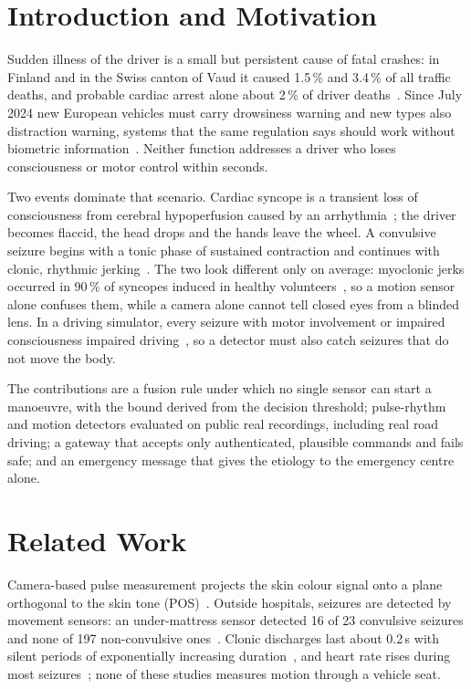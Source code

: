 \documentclass[conference]{IEEEtran}
\begin{document}
\section{Introduction and Motivation}
Sudden illness of the driver is a small but persistent cause of fatal crashes: in Finland and in the Swiss canton of Vaud it caused 1.5\,\% and 3.4\,\% of all traffic deaths, and probable cardiac arrest alone about 2\,\% of driver deaths~\cite{halinen1994}. Since July 2024 new European vehicles must carry drowsiness warning and new types also distraction warning, systems that the same regulation says should work without biometric information~\cite{eu2019gsr}. Neither function addresses a driver who loses consciousness or motor control within seconds.

Two events dominate that scenario. Cardiac syncope is a transient loss of consciousness from cerebral hypoperfusion caused by an arrhythmia~\cite{shen2017}; the driver becomes flaccid, the head drops and the hands leave the wheel. A convulsive seizure begins with a tonic phase of sustained contraction and continues with clonic, rhythmic jerking~\cite{fisher2017}. The two look different only on average: myoclonic jerks occurred in 90\,\% of syncopes induced in healthy volunteers~\cite{lempert1994}, so a motion sensor alone confuses them, while a camera alone cannot tell closed eyes from a blinded lens. In a driving simulator, every seizure with motor involvement or impaired consciousness impaired driving~\cite{kumar2022}, so a detector must also catch seizures that do not move the body.

The contributions are a fusion rule under which no single sensor can start a manoeuvre, with the bound derived from the decision threshold; pulse-rhythm and motion detectors evaluated on public real recordings, including real road driving; a gateway that accepts only authenticated, plausible commands and fails safe; and an emergency message that gives the etiology to the emergency centre alone.

\section{Related Work}
Camera-based pulse measurement projects the skin colour signal onto a plane orthogonal to the skin tone (POS)~\cite{wang2017pos}. Outside hospitals, seizures are detected by movement sensors: an under-mattress sensor detected 16 of 23 convulsive seizures and none of 197 non-convulsive ones~\cite{nouboue2023}. Clonic discharges last about 0.2\,s with silent periods of exponentially increasing duration~\cite{conradsen2013}, and heart rate rises during most seizures~\cite{eggleston2014}; none of these studies measures motion through a vehicle seat.
\end{document}
